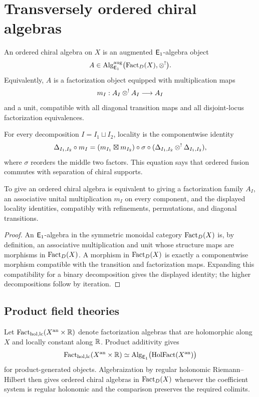 \chapter{Transversely ordered chiral algebras}
\begin{definition}
An ordered chiral algebra on $X$ is an augmented $\mathsf E_1$-algebra object
\[
 A\in \operatorname{Alg}_{\mathsf E_1}^{\mathrm{aug}}\bigl(\operatorname{Fact}_D(X),\otimes^!\bigr).
\]
Equivalently, $A$ is a factorization object equipped with multiplication maps
\[
 m_I:A_I\otimes^!A_I\longrightarrow A_I
\]
and a unit, compatible with all diagonal transition maps and all disjoint-locus factorization equivalences.
\end{definition}

For every decomposition $I=I_1\sqcup I_2$, locality is the componentwise identity
\[
 \Delta_{I_1,I_2}\circ m_I
 = (m_{I_1}\boxtimes m_{I_2})\circ\sigma\circ
   (\Delta_{I_1,I_2}\otimes^!\Delta_{I_1,I_2}),
\]
where $\sigma$ reorders the middle two factors. This equation says that ordered fusion commutes with separation of chiral supports.

\begin{theorem}
To give an ordered chiral algebra is equivalent to giving a factorization family $A_I$, an associative unital multiplication $m_I$ on every component, and the displayed locality identities, compatibly with refinements, permutations, and diagonal transitions.
\end{theorem}
\begin{proof}
An $\mathsf E_1$-algebra in the symmetric monoidal category $\operatorname{Fact}_D(X)$ is, by definition, an associative multiplication and unit whose structure maps are morphisms in $\operatorname{Fact}_D(X)$. A morphism in $\operatorname{Fact}_D(X)$ is exactly a componentwise morphism compatible with the transition and factorization maps. Expanding this compatibility for a binary decomposition gives the displayed identity; the higher decompositions follow by iteration.
\end{proof}

\section{Product field theories}
Let $\operatorname{Fact}_{\mathrm{hol,lc}}(X^{\mathrm{an}}\times\mathbb R)$ denote factorization algebras that are holomorphic along $X$ and locally constant along $\mathbb R$. Product additivity gives
\[
 \operatorname{Fact}_{\mathrm{hol,lc}}(X^{\mathrm{an}}\times\mathbb R)
 \simeq
 \operatorname{Alg}_{\mathsf E_1}\bigl(\operatorname{HolFact}(X^{\mathrm{an}})\bigr)
\]
for product-generated objects. Algebraization by regular holonomic Riemann--Hilbert then gives ordered chiral algebras in $\operatorname{Fact}_D(X)$ whenever the coefficient system is regular holonomic and the comparison preserves the required colimits.

